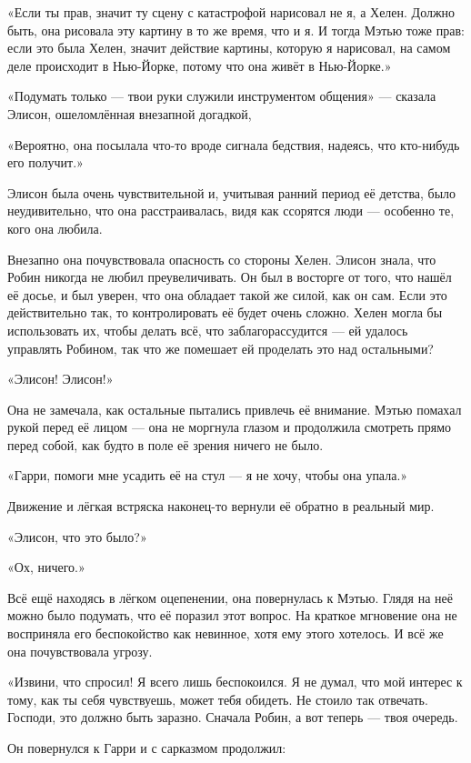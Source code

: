 \documentclass[a5paper, 9pt,
final, openany, twoside=true]{memoir}
\begin{document}
«Если ты прав, значит ту сцену с катастрофой нарисовал не я, а Хелен. Должно быть, она рисовала эту картину в то же время, что и я. И тогда Мэтью тоже прав: если это была Хелен, значит действие картины, которую я нарисовал, на самом деле происходит в Нью-Йорке, потому что она живёт в Нью-Йорке.»

«Подумать только — твои руки служили инструментом общения» — сказала Элисон, ошеломлённая внезапной догадкой,

«Вероятно, она посылала что-то вроде сигнала бедствия, надеясь, что кто-нибудь его получит.»\bigskip

Элисон была очень чувствительной и, учитывая ранний период её детства, было неудивительно, что она расстраивалась, видя как ссорятся люди — особенно те, кого она любила.

Внезапно она почувствовала опасность со стороны Хелен. Элисон знала, что Робин никогда не любил преувеличивать. Он был в восторге от того, что нашёл её досье, и был уверен, что она обладает такой же силой, как он сам. Если это действительно так, то контролировать её будет очень сложно. Хелен могла бы использовать их, чтобы делать всё, что заблагорассудится — ей удалось управлять Робином, так что же помешает ей проделать это над остальными?

«Элисон! Элисон!»

Она не замечала, как остальные пытались привлечь её внимание. Мэтью помахал рукой перед её лицом — она не моргнула глазом и продолжила смотреть прямо перед собой, как будто в поле её зрения ничего не было.

«Гарри, помоги мне усадить её на стул — я не хочу, чтобы она упала.»

Движение и лёгкая встряска наконец-то вернули её обратно в реальный мир.

«Элисон, что это было?»

«Ох, ничего.»

Всё ещё находясь в лёгком оцепенении, она повернулась к Мэтью. Глядя на неё можно было подумать, что её поразил этот вопрос. На краткое мгновение она не восприняла его беспокойство как невинное, хотя ему этого хотелось. И всё же она почувствовала угрозу.

«Извини, что спросил! Я всего лишь беспокоился. Я не думал, что мой интерес к тому, как ты себя чувствуешь, может тебя обидеть. Не стоило так отвечать. Господи, это должно быть заразно. Сначала Робин, а вот теперь — твоя очередь.

Он повернулся к Гарри и с сарказмом продолжил:
\end{document}
